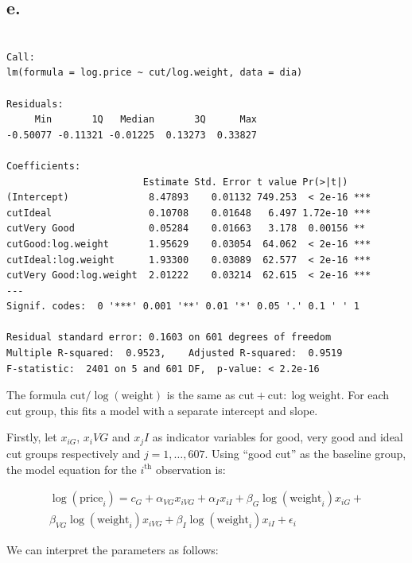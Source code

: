 \documentclass[
  11pt,
]{article}
\begin{document}
\subsection{e.}\label{e.-1}

\begin{verbatim}

Call:
lm(formula = log.price ~ cut/log.weight, data = dia)

Residuals:
     Min       1Q   Median       3Q      Max 
-0.50077 -0.11321 -0.01225  0.13273  0.33827 

Coefficients:
                        Estimate Std. Error t value Pr(>|t|)    
(Intercept)              8.47893    0.01132 749.253  < 2e-16 ***
cutIdeal                 0.10708    0.01648   6.497 1.72e-10 ***
cutVery Good             0.05284    0.01663   3.178  0.00156 ** 
cutGood:log.weight       1.95629    0.03054  64.062  < 2e-16 ***
cutIdeal:log.weight      1.93300    0.03089  62.577  < 2e-16 ***
cutVery Good:log.weight  2.01222    0.03214  62.615  < 2e-16 ***
---
Signif. codes:  0 '***' 0.001 '**' 0.01 '*' 0.05 '.' 0.1 ' ' 1

Residual standard error: 0.1603 on 601 degrees of freedom
Multiple R-squared:  0.9523,    Adjusted R-squared:  0.9519 
F-statistic:  2401 on 5 and 601 DF,  p-value: < 2.2e-16
\end{verbatim}

The formula \(\text{cut}/\log(\text{weight})\) is the same as
\(\text{cut} + \text{cut}:\log{\text{weight}}\). For each cut group,
this fits a model with a separate intercept and slope.

Firstly, let \(x_{iG}\), \(x_iVG\) and \(x_jI\) as indicator variables
for good, very good and ideal cut groups respectively and
\(j = 1, \dots, 607\). Using ``good cut'' as the baseline group, the
model equation for the \(i^{\text{th}}\) observation is:

\begin{multline}
  \log(\text{price}_i) = c_G + \alpha_{VG} x_{iVG} + \alpha_I x_{iI} + \beta_G \log(\text{weight}_i) x_{iG} + \\ \beta_{VG} \log(\text{weight}_i) x_{iVG} + \beta_{I} \log(\text{weight}_i) x_{iI} + \epsilon_i
\end{multline}

We can interpret the parameters as follows:
\end{document}
